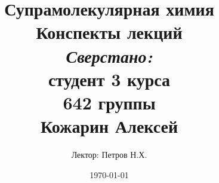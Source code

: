 
\author{Лектор: Петров Н.Х.}



\title{
	\textbf{Супрамолекулярная химия} \\
	\vspace{1in}
	{Конспекты лекций} \\
	\vspace{2.5in}
	\raggedleft \large \emph{Сверстано:}\\ 
		студент 3 курса\\ 
		642 группы\\ 
		Кожарин Алексей \\
}

\date{\today} %

